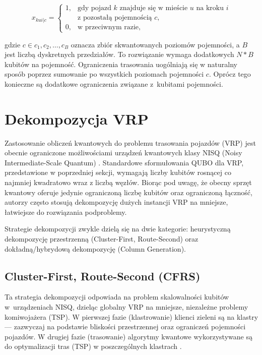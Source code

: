 \begin{equation}
x_{kui|c} =
\begin{cases}
1, & \text{gdy pojazd } k \text{ znajduje się w mieście } u \text{ na kroku } i \\ & \text{z pozostałą pojemnością } c, \\
0, & \text{w przeciwnym razie},
\end{cases}
\end{equation}

gdzie $c \in {c_1, c_2, \ldots, c_{B}}$ oznacza zbiór skwantowanych poziomów pojemności, a $B$ jest liczbą dyskretnych przedziałów. To rozwiązanie wymaga dodatkowych $N * B$ kubitów na pojemność.
Ograniczenia trasowania uogólniają się w naturalny sposób poprzez sumowanie po wszystkich poziomach pojemności $c$. Oprócz tego konieczne są dodatkowe ograniczenia związane z~kubitami pojemności.

\section{Dekompozycja VRP}
Zastosowanie obliczeń kwantowych do problemu trasowania pojazdów (VRP) jest obecnie ograniczone możliwościami urządzeń kwantowych klasy NISQ (Noisy Intermediate-Scale Quantum) \cite{maciejunes2025solvinglargescalevehiclerouting}. Standardowe sformułowania QUBO dla VRP, przedstawione w poprzedniej sekcji, wymagają liczby kubitów rosnącej co najmniej kwadratowo wraz z liczbą węzłów. Biorąc pod uwagę, że obecny sprzęt kwantowy oferuje jedynie ograniczoną liczbę kubitów oraz ograniczoną łączność, autorzy często stosują dekompozycję dużych instancji VRP na mniejsze, łatwiejsze do rozwiązania podproblemy.

Strategie dekompozycji zwykle dzielą się na dwie kategorie: heurystyczną dekompozycję przestrzenną (Cluster-First, Route-Second) oraz dokładną/hybrydową dekompozycję (Column Generation).

\subsection{Cluster-First, Route-Second (CFRS)}
Ta strategia dekompozycji odpowiada na problem skalowalności kubitów w~urządzeniach NISQ, dzieląc globalny VRP na mniejsze, niezależne problemy komiwojażera (TSP). W pierwszej fazie (klastrowanie) klienci zieleni są na klastry — zazwyczaj na podstawie bliskości przestrzennej oraz ograniczeń pojemności pojazdów. W drugiej fazie (trasowanie) algorytmy kwantowe wykorzystywane są do optymalizacji tras (TSP) w poszczególnych klastrach \cite{Feld_2019}.

